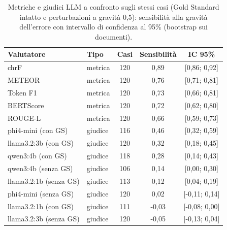 \begin{table}[htbp]
  \centering
  \small
  \begin{tabular}{llccc}
    \toprule
    \textbf{Valutatore} & \textbf{Tipo} & \textbf{Casi} & \textbf{Sensibilità} & \textbf{IC 95\%} \\
    \midrule
    chrF & metrica & 120 & 0,89 & [0,86; 0,92] \\
    METEOR & metrica & 120 & 0,76 & [0,71; 0,81] \\
    Token F1 & metrica & 120 & 0,73 & [0,66; 0,81] \\
    BERTScore & metrica & 120 & 0,72 & [0,62; 0,80] \\
    ROUGE-L & metrica & 120 & 0,66 & [0,59; 0,73] \\
    phi4-mini (con GS) & giudice & 116 & 0,46 & [0,32; 0,59] \\
    llama3.2:3b (con GS) & giudice & 120 & 0,32 & [0,18; 0,45] \\
    qwen3:4b (con GS) & giudice & 118 & 0,28 & [0,14; 0,43] \\
    qwen3:4b (senza GS) & giudice & 106 & 0,14 & [0,00; 0,30] \\
    llama3.2:1b (senza GS) & giudice & 113 & 0,12 & [0,04; 0,19] \\
    phi4-mini (senza GS) & giudice & 120 & 0,02 & [-0,11; 0,14] \\
    llama3.2:1b (con GS) & giudice & 111 & -0,03 & [-0,08; 0,00] \\
    llama3.2:3b (senza GS) & giudice & 120 & -0,05 & [-0,13; 0,04] \\
    \bottomrule
  \end{tabular}
  \caption{Metriche e giudici LLM a confronto sugli stessi casi (Gold Standard intatto e perturbazioni a gravità 0,5): sensibilità alla gravità dell'errore con intervallo di confidenza al 95\% (bootstrap sui documenti).}
  \label{tab:same-cases}
\end{table}
